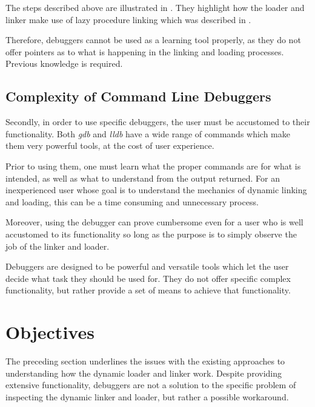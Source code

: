 The steps described above are illustrated in . They highlight how the loader and linker make use of lazy procedure linking which was described in .

Therefore, debuggers cannot be used as a learning tool properly, as they do not offer pointers as to what is happening in the linking and loading processes. Previous knowledge is required.

\subsection{Complexity of Command Line Debuggers}
\label{sub-sec:complex-cmd-dbg}

Secondly, in order to use specific debuggers, the user must be accustomed to their functionality. Both \textit{gdb} and \textit{lldb} have a wide range of commands which make them very powerful tools, at the cost of user experience.

Prior to using them, one must learn what the proper commands are for what is intended, as well as what to understand from the output returned. For an inexperienced user whose goal is to understand the mechanics of dynamic linking and loading, this can be a time consuming and unnecessary process.

Moreover, using the debugger can prove cumbersome even for a user who is well accustomed to its functionality so long as the purpose is to simply observe the job of the linker and loader.

Debuggers are designed to be powerful and versatile tools which let the user decide what task they should be used for. They do not offer specific complex functionality, but rather provide a set of means to achieve that functionality.

\section{Objectives}
\label{sec:objectives}

The preceding section underlines the issues with the existing approaches to understanding how the dynamic loader and linker work. Despite providing extensive functionality, debuggers are not a solution to the specific problem of inspecting the dynamic linker and loader, but rather a possible workaround. 

